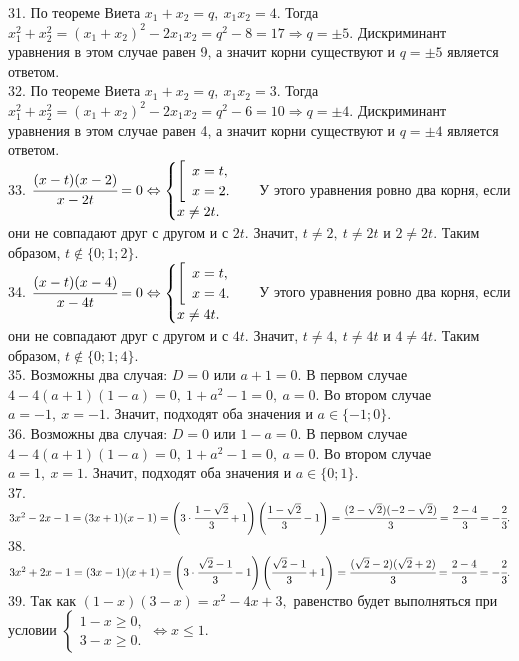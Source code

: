 31. По теореме Виета $x_1+x_2=q,\ x_1x_2=4.$ Тогда $x_1^2+x_2^2=(x_1+x_2)^2-2x_1x_2=q^2-8=17\Rightarrow q=\pm5.$ Дискриминант уравнения в этом случае равен 9, а значит корни существуют и $q=\pm5$ является ответом.\\
32. По теореме Виета $x_1+x_2=q,\ x_1x_2=3.$ Тогда $x_1^2+x_2^2=(x_1+x_2)^2-2x_1x_2=q^2-6=10\Rightarrow q=\pm4.$ Дискриминант уравнения в этом случае равен 4, а значит корни существуют и $q=\pm4$ является ответом.\\
33. $\cfrac{(x-t)(x-2)}{x-2t}=0\Leftrightarrow\begin{cases}\left[\begin{array}{l}x=t,\\ x=2.\end{array}\right.\\x\neq2t.\end{cases}$ У этого уравнения ровно два корня, если они не совпадают друг с другом и с $2t.$ Значит, $t\neq2,\ t\neq2t$ и $2\neq2t.$ Таким образом, $t\notin\{0; 1; 2\}.$\\
34. $\cfrac{(x-t)(x-4)}{x-4t}=0\Leftrightarrow\begin{cases}\left[\begin{array}{l}x=t,\\ x=4.\end{array}\right.\\x\neq4t.\end{cases}$ У этого уравнения ровно два корня, если они не совпадают друг с другом и с $4t.$ Значит, $t\neq4,\ t\neq4t$ и $4\neq4t.$ Таким образом, $t\notin\{0; 1; 4\}.$\\
35. Возможны два случая: $D=0$ или $a+1=0.$ В первом случае $4-4(a+1)(1-a)=0,\ 1+a^2-1=0,\ a=0.$ Во втором случае $a=-1,\ x=-1.$ Значит, подходят оба значения и $a\in\{-1;0\}.$\\
36. Возможны два случая: $D=0$ или $1-a=0.$ В первом случае $4-4(a+1)(1-a)=0,\ 1+a^2-1=0,\ a=0.$ Во втором случае $a=1,\ x=1.$ Значит, подходят оба значения и $a\in\{0;1\}.$\\
37. $3x^2-2x-1=(3x+1)(x-1)=\left(3\cdot\cfrac{1-\sqrt{2}}{3}+1\right)\left(\cfrac{1-\sqrt{2}}{3}-1\right)=\cfrac{(2-\sqrt{2})(-2-\sqrt{2})}{3}=\cfrac{2-4}{3}=-\cfrac{2}{3}.$\\
38. $3x^2+2x-1=(3x-1)(x+1)=\left(3\cdot\cfrac{\sqrt{2}-1}{3}-1\right)\left(\cfrac{\sqrt{2}-1}{3}+1\right)=\cfrac{(\sqrt{2}-2)(\sqrt{2}+2)}{3}=\cfrac{2-4}{3}=-\cfrac{2}{3}.$\\
39. Так как $(1-x)(3-x)=x^2-4x+3,$ равенство будет выполняться при условии $\begin{cases}1-x\geqslant0,\\ 3-x\geqslant0.\end{cases}\Leftrightarrow x\leqslant1.$\\

